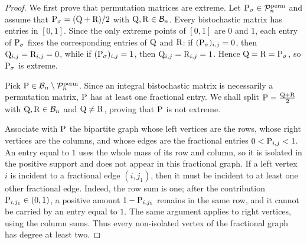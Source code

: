 \begin{proof}
We first prove that permutation matrices are extreme. Let $\P_\sigma\in\mathcal P_n^{\mathrm{perm}}$ and assume that $\P_\sigma=(\Q+\R)/2$ with $\Q,\R\in\mathcal B_n$.
Every bistochastic matrix has entries in $[0,1]$. Since the only extreme points of $[0,1]$ are $0$ and $1$, each entry of $\P_\sigma$ fixes the corresponding entries of $\Q$ and $\R$: if $(\P_\sigma)_{i,j}=0$, then $\Q_{i,j}=\R_{i,j}=0$, while if $(\P_\sigma)_{i,j}=1$, then $\Q_{i,j}=\R_{i,j}=1$. Hence $\Q=\R=\P_\sigma$, so $\P_\sigma$ is extreme.

Pick $\P\in\mathcal B_n\setminus\mathcal P_n^{\mathrm{perm}}$. Since an integral bistochastic matrix is necessarily a permutation matrix, $\P$ has at least one fractional entry. We shall split
\(\P=\frac{\Q+\R}{2}\)
with $\Q,\R\in\mathcal B_n$ and $\Q\neq \R$, proving that $\P$ is not extreme.

Associate with $\P$ the bipartite graph whose left vertices are the rows, whose right vertices are the columns, and whose edges are the fractional entries
\(0<\P_{i,j}<1\).
An entry equal to $1$ uses the whole mass of its row and column, so it is isolated in the positive support and does not appear in this fractional graph. If a left vertex $i$ is incident to a fractional edge $(i,j_1)$, then it must be incident to at least one other fractional edge. Indeed, the row sum is one; after the contribution $\P_{i,j_1}\in(0,1)$, a positive amount $1-\P_{i,j_1}$ remains in the same row, and it cannot be carried by an entry equal to $1$. The same argument applies to right vertices, using the column sums. Thus every non-isolated vertex of the fractional graph has degree at least two.


\end{proof}
